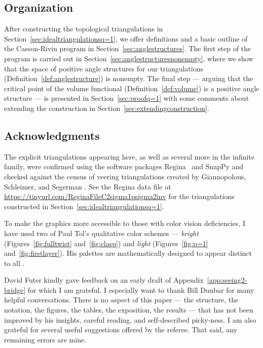 \documentclass[reqno]{amsart}
\theoremstyle{plain}
\theoremstyle{definition}
\begin{document}
\subsection*{Organization} 
After constructing the topological triangulations in Section~\ref{sec:idealtriangulationsq=1}, we offer definitions and a basic outline of the Casson-Rivin program in Section~\ref{sec:anglestructures}. 
The first step of the program is carried out in Section~\ref{sec:anglestructuresnonempty}, where we show that the space of positive angle structures for our triangulations (Definition~\ref{def:anglestructure}) is nonempty. The final step --- arguing that the critical point of the volume functional (Definition~\ref{def:volume}) is a positive angle structure --- is presented in Section~\ref{sec:proofq=1} with some comments about extending the construction in Section~\ref{sec:extendingconstruction}.

\subsection*{Acknowledgments} 
The explicit triangulations appearing here, as well as several more in the infinite family, were confirmed using the software packages Regina~\cite{Regina} and SnapPy \cite{SnapPy} and checked against the census of veering triangulations created by Giannopolous, Schleimer, and Segerman \cite{VeeringCensus}.  See the Regina data file at \href{https://tinyurl.com/ReginaFileC2sigma1psigma2inv}{https://tinyurl.com/ReginaFileC2sigma1psigma2inv} for the triangulations constructed in Section~\ref{sec:idealtriangulationsq=1}.

To make the graphics more accessible to those with color vision deficiencies, I have used two of Paul Tol's qualitative color schemes --- \emph{bright} (Figures~\ref{fig:fulltwist} and~\ref{fig:clasp}) and \emph{light} (Figures~\ref{fig:p=1} and~\ref{fig:firstlayer}).  His palettes are mathematically designed to appear distinct to all \cite{PaulTol}.

David Futer kindly gave feedback on an early draft of Appendix~\ref{app:seeing2-bridge} for which I am grateful.  
I especially want to thank Bill Dunbar for many helpful conversations.  There is no aspect of this paper --- the structure, the notation, the figures, the tables, the exposition, the results --- that has not been improved by his insights, careful reading, and self-described picky-ness.  I am also grateful for several useful suggestions offered by the referee.  That said, any remaining errors are mine.
\end{document}
